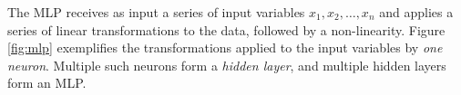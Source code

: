 The MLP receives as input a series of input variables $x_1, x_2, \dots, x_n$ and applies a series of linear transformations to the data, followed by a non-linearity. Figure \ref{fig:mlp} exemplifies the transformations applied to the input variables by \textit{one neuron}. Multiple such neurons form a \textit{hidden layer}, and multiple hidden layers form an MLP.

